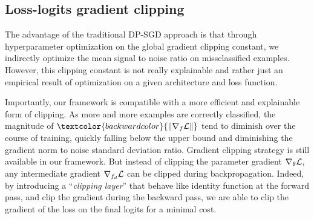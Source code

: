 
\subsection{Loss-logits gradient clipping}

    The advantage of the traditional DP-SGD approach is that through hyperparameter optimization on the global gradient clipping constant, we indirectly optimize the mean signal to noise ratio on missclassified examples. However, this clipping constant is not really explainable and rather just an empirical result of optimization on a given architecture and loss function. 

    Importantly, our framework is compatible with a more efficient and explainable form of clipping. As more and more examples are correctly classified, the magnitude of $\textcolor{backwardcolor}{\|\nabla_f \Loss\|}$ tend to diminish over the course of training, quickly falling below the upper bound and diminishing the gradient norm to noise standard deviation ratio. Gradient clipping strategy is still available in our framework. But instead of clipping the parameter gradient $\nabla_{\theta}\mathcal{L}$, any intermediate gradient $\nabla_{f_d}\mathcal{L}$ can be clipped during backpropagation. Indeed, by introducing a ``\textit{clipping layer}'' that behave like identity function at the forward pass, and clip the gradient during the backward pass, we are able to clip the gradient of the loss on the final logits for a minimal cost.  
    
